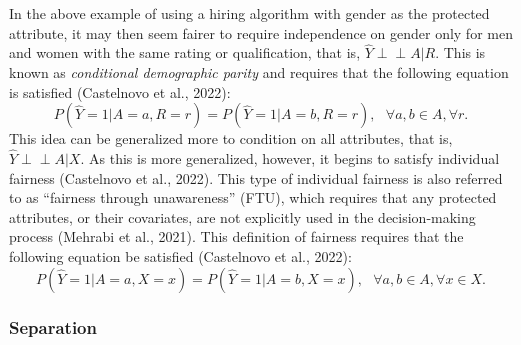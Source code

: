\documentclass[12pt, twoside]{amherstthesis}
\begin{document}
In the above example of using a hiring algorithm with gender as the protected attribute, it may then seem fairer to require independence on gender only for men and women with the same rating or qualification, that is, \(\hat{Y} \perp \!\!\! \perp A | R\). This is known as \emph{conditional demographic parity} and requires that the following equation is satisfied (Castelnovo et al., 2022):
\begin{equation}
\label{ch1eq4}
P (\hat{Y} = 1 | A = a, R = r) = P (\hat{Y} = 1 | A = b, R = r), \text{    } \forall a, b \in A, \forall r.
\end{equation}
This idea can be generalized more to condition on all attributes, that is, \(\hat{Y} \perp \!\!\! \perp A | X\). As this is more generalized, however, it begins to satisfy individual fairness (Castelnovo et al., 2022). This type of individual fairness is also referred to as ``fairness through unawareness'' (FTU), which requires that any protected attributes, or their covariates, are not explicitly used in the decision-making process (Mehrabi et al., 2021). This definition of fairness requires that the following equation be satisfied (Castelnovo et al., 2022):
\begin{equation}
\label{ch1eq5}
P (\hat{Y} = 1 | A = a, X = x) = P (\hat{Y} = 1 | A = b, X = x), \text{ } \forall a, b \in A, \forall x \in X.
\end{equation}
\hypertarget{separation}{%
\subsubsection{Separation}\label{separation}}
\end{document}
